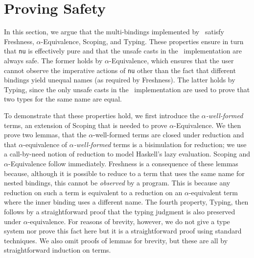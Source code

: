 \documentclass[natbib]{sigplanconf}
\begin{document}
\section{Proving Safety}
\label{sec:safety}

In this section, we argue that the multi-bindings implemented by
\ourlib\ satisfy Freshness, $\alpha$-Equivalence, Scoping, and Typing.
These properties ensure in turn that \lstinline{nu} is effectively
pure and that the unsafe casts in the \ourlib\ implementation are
always safe. The former holds by $\alpha$-Equivalence, which ensures
that the user cannot observe the imperative actions of \lstinline{nu}
other than the fact that different bindings yield unequal names (as
required by Freshness). The latter holds by Typing, since the only
unsafe casts in the \ourlib\ implementation are used to prove that two
types for the same name are equal.

To demonstrate that these properties hold, we first introduce the
\emph{$\alpha$-well-formed} terms, an extension of Scoping that is
needed to prove $\alpha$-Equivalence. We then prove two lemmas, that
the $\alpha$-well-formed terms are closed under reduction and that
$\alpha$-equivalence of \emph{$\alpha$-well-formed} terms is a
bisimulation for reduction; we use a call-by-need notion of reduction
to model Haskell's lazy evaluation. Scoping and $\alpha$-Equivalence
follow immediately. Freshness is a consequence of these lemmas
because, although it is possible to reduce to a term that uses the
same name for nested bindings, this cannot be \emph{observed} by a
program. This is because any reduction on such a term is equivalent to
a reduction on an $\alpha$-equivalent term where the inner binding
uses a different name. The fourth property, Typing, then follows by a
straightforward proof that the typing judgment is also preserved under
$\alpha$-equivalence. For reasons of brevity, however, we do not give
a type system nor prove this fact here but it is a straightforward
proof using standard techniques. We also omit proofs of lemmas for
brevity, but these are all by straightforward induction on terms.
\end{document}

